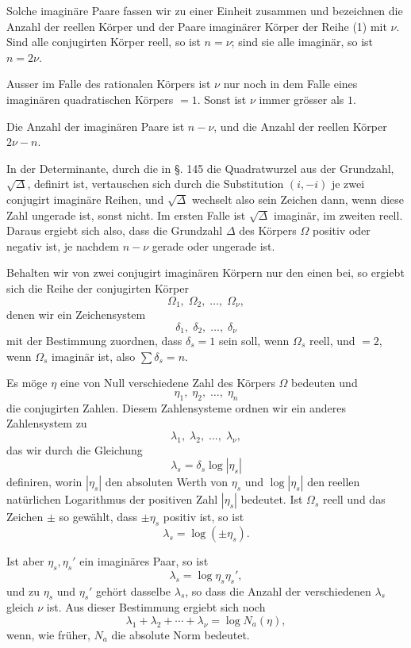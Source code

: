 \documentclass[12pt,a4paper]{article}
\begin{document}
Solche imaginäre Paare fassen wir zu einer Einheit zusammen und bezeichnen die Anzahl der reellen Körper und der Paare imaginärer Körper der Reihe (1) mit $\nu$. Sind alle conjugirten Körper reell, so ist $n = \nu$; sind sie alle imaginär, so ist $n = 2\nu$.

Ausser im Falle des rationalen Körpers ist $\nu$ nur noch in dem Falle eines imaginären quadratischen Körpers $= 1$. Sonst ist $\nu$ immer grösser als $1$.

Die Anzahl der imaginären Paare ist $n - \nu$, und die Anzahl der reellen Körper $2\nu - n$.

In der Determinante, durch die in \S. 145 die Quadratwurzel aus der Grundzahl, $\sqrt{\Delta}$, definirt ist, vertauschen sich durch die Substitution $(i, -i)$ je zwei conjugirt imaginäre Reihen, und $\sqrt{\Delta}$ wechselt also sein Zeichen dann, wenn diese Zahl ungerade ist, sonst nicht. Im ersten Falle ist $\sqrt{\Delta}$ imaginär, im zweiten reell. Daraus ergiebt sich also, dass die Grundzahl $\Delta$ des Körpers $\Omega$ positiv oder negativ ist, je nachdem $n - \nu$ gerade oder ungerade ist.

Behalten wir von zwei conjugirt imaginären Körpern nur den einen bei, so ergiebt sich die Reihe der conjugirten Körper
\[
\Omega_1,\; \Omega_2,\; \ldots,\; \Omega_\nu,
\]
denen wir ein Zeichensystem
\[
\delta_1,\; \delta_2,\; \ldots,\; \delta_\nu
\]
mit der Bestimmung zuordnen, dass $\delta_s = 1$ sein soll, wenn $\Omega_s$ reell, und $= 2$, wenn $\Omega_s$ imaginär ist, also $\sum\delta_s = n$.

Es möge $\eta$ eine von Null verschiedene Zahl des Körpers $\Omega$ bedeuten und
\[
\eta_1,\; \eta_2,\; \ldots,\; \eta_n
\]
die conjugirten Zahlen. Diesem Zahlensysteme ordnen wir ein anderes Zahlensystem zu
\[
\lambda_1,\; \lambda_2,\; \ldots,\; \lambda_\nu,
\]
das wir durch die Gleichung
\begin{equation}\label{eq:185-2}
\lambda_s = \delta_s \log|\eta_s|
\end{equation}
definiren, worin $|\eta_s|$ den absoluten Werth von $\eta_s$ und $\log|\eta_s|$ den reellen natürlichen Logarithmus der positiven Zahl $|\eta_s|$ bedeutet. Ist $\Omega_s$ reell und das Zeichen $\pm$ so gewählt, dass $\pm\eta_s$ positiv ist, so ist
\[
\lambda_s = \log(\pm\eta_s).
\]

Ist aber $\eta_s, \eta_s'$ ein imaginäres Paar, so ist
\[
\lambda_s = \log \eta_s\eta_s',
\]
und zu $\eta_s$ und $\eta_s'$ gehört dasselbe $\lambda_s$, so dass die Anzahl der verschiedenen $\lambda_s$ gleich $\nu$ ist. Aus dieser Bestimmung ergiebt sich noch
\begin{equation}\label{eq:185-3}
\lambda_1 + \lambda_2 + \cdots + \lambda_\nu = \log N_a(\eta),
\end{equation}
wenn, wie früher, $N_a$ die absolute Norm bedeutet.
\end{document}
